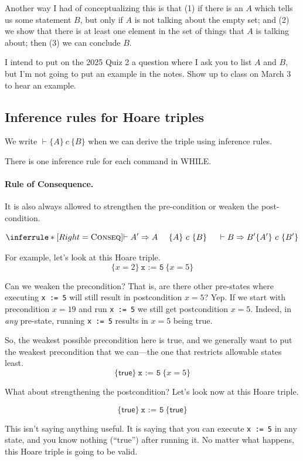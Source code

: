 \documentclass[11pt]{article}
\begin{document}
Another way I had of conceptualizing this is that (1) if there is an $A$ which tells us some statement $B$, but
only if $A$ is not talking about the empty set; and (2) we show that there is at least one element in the set of
things that $A$ is talking about; then (3) we can conclude $B$.

I intend to put on the 2025 Quiz 2 a question where I ask you to list $A$ and $B$, but I'm not going
to put an example in the notes. Show up to class on March 3 to hear an example.

\subsection*{Inference rules for Hoare triples} We write $\vdash \{A\}~c~\{B\}$ when we can derive
the triple using inference rules.

There is one inference rule for each command in WHILE.

\paragraph{Rule of Consequence.} It is also always allowed to strengthen the pre-condition or weaken the post-condition.

\[
\inferrule*[Right=\textsc{Conseq}]{\vdash A' \Rightarrow A ~~~~ \{A\}~c~\{B\}~~~~ \vdash B \Rightarrow B'}{\{A'\}~c~\{B'\}}
\]

For example, let's look at this Hoare triple.
\[ \{ x = 2 \} ~ \texttt{x := 5}~ \{ x = 5 \} \]

Can we weaken the precondition? That is, are there other pre-states where executing \texttt{x := 5} will still result in postcondition
$x=5$? Yep. If we start with precondition $ x = 19$ and run \texttt{x := 5} we still get postcondition $x=5$. Indeed, in \emph{any} pre-state,
running \texttt{x := 5} results in $x=5$ being true.

So, the weakest possible precondition here is \textsf{true}, and we generally want to put the weakest precondition that we can---the one that restricts
allowable states least.
\[ \{ \mathsf{true} \} ~ \texttt{x := 5}~ \{ x = 5 \} \]

What about strengthening the postcondition? Let's look now at this Hoare triple.

\[ \{ \mathsf{true} \} ~ \texttt{x := 5}~ \{ \mathsf{true} \} \]

This isn't saying anything useful. It is saying that you can execute \texttt{x := 5} in any state, and you know nothing (``true'') after running it.
No matter what happens, this Hoare triple is going to be valid.
\end{document}
